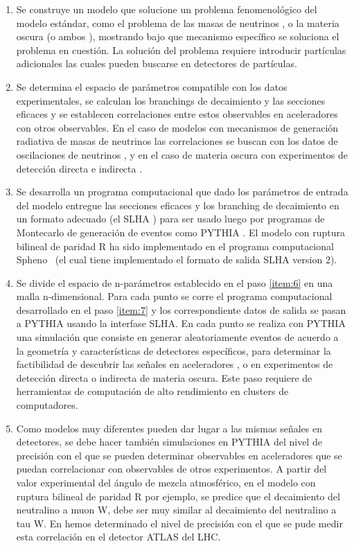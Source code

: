 \begin{enumerate}
\item Se construye un modelo que solucione un problema fenomenológico
  del modelo estándar, como el problema de las masas de neutrinos
  \cite{Hirsch:2000ef}, o la materia oscura (o ambos
  \cite{Hirsch:2005ag}), mostrando bajo que mecanismo específico se
  soluciona el problema en cuestión. La solución del problema requiere
  introducir partículas adicionales las cuales pueden buscarse en
  detectores de partículas.
  \label{item:5}
\item Se determina el espacio de parámetros compatible con los datos
  experimentales, se calculan los branchings de decaimiento y las
  secciones eficaces y se establecen correlaciones entre estos
  observables en aceleradores con otros observables. En el caso de
  modelos con mecanismos de generación radiativa de masas de neutrinos
  las correlaciones se buscan con los datos de oscilaciones de
  neutrinos \cite{Diaz:2003as}, y en el caso de materia oscura con
  experimentos de detección directa e indirecta \cite{Choi:2010xn}.
  \label{item:6}
\item Se desarrolla un programa computacional que dado los parámetros
  de entrada del modelo entregue las secciones eficaces y los
  branching de decaimiento en un formato adecuado (el SLHA
  \cite{Allanach:2008qq}) para ser usado luego por programas de Montecarlo
  de generación de eventos como PYTHIA \cite{Sjostrand:2006za}. El
  modelo con ruptura bilineal de paridad R ha sido implementado en el
  programa computacional Spheno~\cite{Porod:2003um} (el cual tiene
  implementado el formato de salida SLHA version 2).
  \label{item:7}
\item Se divide el espacio de n-parámetros establecido en el paso
  \ref{item:6} en una malla n-dimensional. Para cada punto se corre el
  programa computacional desarrollado en el paso \ref{item:7} y los
  correspondiente datos de salida se pasan a PYTHIA usando la
  interfase SLHA. En cada punto se realiza con PYTHIA una simulación
  que consiste en generar aleatoriamente eventos de acuerdo a la
  geometría y características de detectores específicos, para
  determinar la factibilidad de descubrir las señales en aceleradores
  \cite{Magro:2003zb,deCampos:2005ri,deCampos:2007bn,deCampos:2008ic,deCampos:2008re},
  o en experimentos de detección directa o indirecta
  \cite{Choi:2010xn} de materia oscura. Este paso requiere de
  herramientas de computación de alto rendimiento en clusters de
  computadores.
  \label{item:8}
\item Como modelos muy diferentes pueden dar lugar a las mismas
  señales en detectores, se debe hacer también simulaciones en PYTHIA
  del nivel de precisión con el que se pueden determinar observables
  en aceleradores que se puedan correlacionar con observables de otros
  experimentos. A partir del valor experimental del ángulo de mezcla
  atmosférico, en el modelo con ruptura bilineal de paridad R por
  ejemplo, se predice que el decaimiento del neutralino a muon W, debe
  ser muy similar al decaimiento del neutralino a tau W. En
  \cite{DeCampos:2010yu} hemos determinado el nivel de precisión con
  el que se pude medir esta correlación en el detector ATLAS del LHC.
  \label{item:9}
\end{enumerate}
